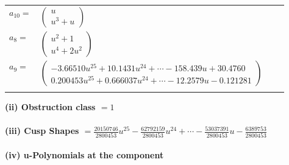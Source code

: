 \documentclass[1p]{elsarticle_modified}
\theoremstyle{definition}
\begin{document}
\begin{tabular}{m{7pt} m{180pt} m{7pt} m{180pt} }
\flushright $a_{10}=$&$\begin{pmatrix}u\\u^3+u\end{pmatrix}$ \\
\flushright $a_{8}=$&$\begin{pmatrix}u^2+1\\u^4+2 u^2\end{pmatrix}$ \\
\flushright $a_{9}=$&$\begin{pmatrix}-3.66510 u^{25}+10.1431 u^{24}+\cdots-158.439 u+30.4760\\0.200453 u^{25}+0.666037 u^{24}+\cdots-12.2579 u-0.121281\end{pmatrix}$\\&\end{tabular}
\flushleft \textbf{(ii) Obstruction class $= 1$}\\~\\
\flushleft \textbf{(iii) Cusp Shapes $= \frac{20150746}{2800453} u^{25}-\frac{62792159}{2800453} u^{24}+\cdots-\frac{53037391}{2800453} u-\frac{6389753}{2800453}$}\\~\\
\newpage\renewcommand{\arraystretch}{1}
\flushleft \textbf{(iv) u-Polynomials at the component}\newline \\
\end{document}
